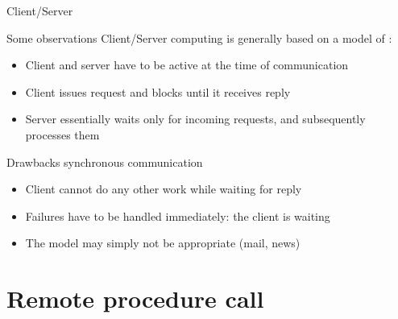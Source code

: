 \begin{slide}{Client/Server}
  \begin{block}{Some observations}
    Client/Server computing is generally based on a model of :
    \begin{itemize}\tightlist
    \item Client and server have to be active at the time of communication
    \item Client issues request and blocks until it receives reply
    \item Server essentially waits only for incoming requests, and subsequently processes them
    \end{itemize}
  \end{block}
  \onslide
  \begin{block}{Drawbacks synchronous communication}
    \begin{itemize}\tightlist
    \item Client cannot do any other work while waiting for reply
    \item Failures have to be handled immediately: the client is waiting
    \item The model may simply not be appropriate (mail, news)
    \end{itemize}
  \end{block}
\end{slide}
\section{Remote procedure call}
